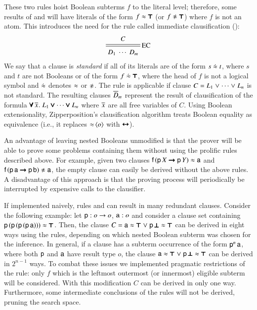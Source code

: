 \newcommand{\eqneq}{\mathrel{\dot{\eq}}}
These two rules hoist Boolean subterms $f$ to the literal level; therefore,
some results of  and  will have literals of the form $f \approx \pmb{\top}$ (or
$f \noteq \itrue$) where $f$ is not an atom. This introduces the need for the rule
called immediate clausification ():
%
$$ \namedsimp{EC}{C}{D_1 \; \cdots \; D_m} $$
%
We say that a clause is \emph{standard} if all of its literals are of the form $s \eqneq t$,
where $s$ and $t$ are not Booleans or of the form $f \eqneq \itrue$, where the head of $f$
is not a logical symbol and $\eqneq$ denotes $\approx$ or $\not\approx$. The rule 
is applicable if clause $C = L_1 \mathrel\lor
\cdots \mathrel\lor L_n$ is not standard.
The resulting clauses $\overline{D}_{m}$ represent
the result of clausification of the formula $\pmb{\forall}\,\overline{x}_{}. \; L_1 \pmb{\lor}
\cdots \pmb{\lor} L_n$ where $\overline{x}_{}$ are all free variables of $C$.
Using Boolean extensionality, Zipperposition's clausification
algorithm treats Boolean equality as equivalence (i.e., it replaces
$\mathop{\approx}{\langle o\rangle}$ with $\pmb{\leftrightarrow}$).

An advantage of leaving nested Booleans unmodified is that the prover will be able
to prove some problems containing them without using the prolific rules described
above. For example, given two clauses $\mathsf{f} \, (\mathsf{p} \, X
\pmb{\rightarrow} \mathsf{p} \, Y) \approx \mathsf{a}$ and $\cst{f} \, (\cst{p} \,
\cst{a} \iimplies \cst{p} \, \cst{b}) \noteq \cst{a}$, the empty clause can
easily be derived without the above rules. A disadvantage of this approach
is that the proving process will periodically be interrupted by expensive calls
to the clausifier.
\pagebreak[2]

If implemented naively, rules  and  can result in many redundant clauses. Consider the following
example: let $\mathsf{p} : o \rightarrow o$, $\mathsf{a} : o$ and consider a clause
set containing $\mathsf{p} \, (\mathsf{p} \, (\mathsf{p} \, (\mathsf{p} \, \mathsf{a}))) \approx
\pmb{\top}$. Then, the clause $C = \mathsf{a} \approx \pmb{\top} \mathrel\lor \mathsf{p} \, \pmb{\bot} \approx \pmb{\top}$ can be
derived in eight ways using the rules, depending on which nested Boolean subterm was
chosen for the inference. In general, if a clause has a subterm occurrence of the form $\mathsf{p}^n \, \mathsf{a}$,
where both $\mathsf{p}$ and $\mathsf{a}$ have result type $o$, the clause $\mathsf{a} \approx \pmb{\top} \mathrel\lor \mathsf{p} \, \pmb{\bot} \approx \pmb{\top}$ can be derived in $2^{n-1}$ ways.
To combat these issues we
implemented pragmatic restrictions of the rule: only $f$ which is
the leftmost outermost (or innermost) eligible subterm will be considered. With
this modification $C$ can be derived in only one way. Furthermore,
some intermediate conclusions of the rules will not be derived, pruning the search space.


